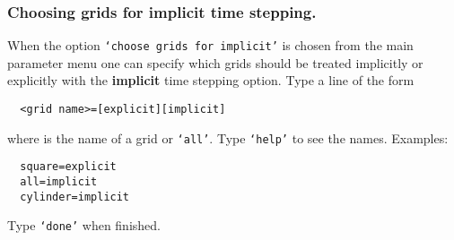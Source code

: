 \subsubsection{Choosing grids for implicit time stepping.}\label{sec:implicitMenu}
 

When the option {\tt `choose grids for implicit'} is chosen from the main parameter menu one can
specify which grids should be treated implicitly or explicitly with the {\bf implicit} time stepping
option. Type a line of the form
\begin{verbatim}
  <grid name>=[explicit][implicit] 
\end{verbatim}
where {\tt <grid name>} is the name of a grid or {\tt `all'}. Type {\tt `help'} to see the names.
Examples:
\begin{verbatim}
  square=explicit
  all=implicit
  cylinder=implicit
\end{verbatim}
Type {\tt `done'} when finished.

